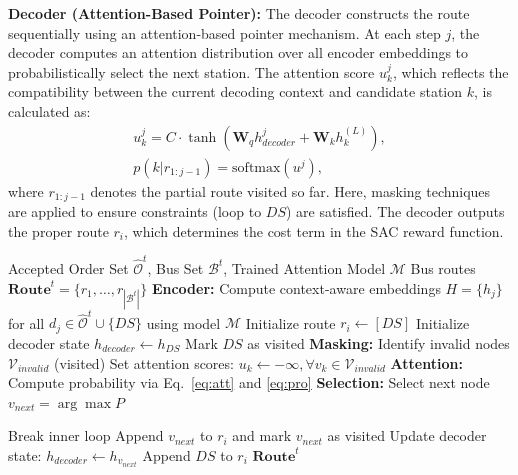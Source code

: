 \documentclass[lettersize,journal]{IEEEtran}
\begin{document}
\textbf{Decoder (Attention-Based Pointer):} 
The decoder constructs the route sequentially using an attention-based pointer mechanism. 
At each step $j$, the decoder computes an attention distribution over all encoder embeddings to probabilistically select the next station. The attention score $u_{k}^{j}$, which reflects the compatibility between the current decoding context and candidate station $k$, is calculated as:
\begin{gather}
    u_{k}^{j} = C \cdot \tanh(\mathbf{W}_{q} h_{decoder}^j + \mathbf{W}_{k} h_{k}^{(L)}), \label{eq:att} \\
    p(k | r_{1:j-1}) = \text{softmax}(u^j), \label{eq:pro}
\end{gather}
where $r_{1:j-1}$ denotes the partial route visited so far. Here, masking techniques are applied to ensure constraints (loop to $DS$) are satisfied. The decoder outputs the proper route $r_i$, which determines the cost term in the SAC reward function.

\color{blue}
\begin{algorithm}[tb]
\caption{Attention-Based Route Generation}
\label{alg:routing}
\begin{algorithmic}[1]
\REQUIRE Accepted Order Set $\hat{\mathcal{O}}^t$, Bus Set $\mathcal{B}^t$, Trained Attention Model $\mathcal{M}$
\ENSURE Bus routes $\mathbf{Route}^t = \{r_1, \dots, r_{|\mathcal{B}^t|}\}$
\STATE \textbf{Encoder:} Compute context-aware embeddings $H = \{h_j\}$ for all $d_j \in \hat{\mathcal{O}}^t \cup \{DS\}$ using model $\mathcal{M}$
    \STATE Initialize route $r_i \leftarrow [DS]$
    \STATE Initialize decoder state $h_{decoder} \leftarrow h_{DS}$ 
    \STATE Mark $DS$ as visited
        \STATE \textbf{Masking:} Identify invalid nodes $\mathcal{V}_{invalid}$ (visited)
        \STATE Set attention scores: $u_k \leftarrow -\infty, \forall v_k \in \mathcal{V}_{invalid}$
        \STATE \textbf{Attention:} Compute probability via Eq.~\eqref{eq:att} and \eqref{eq:pro}
        \STATE \textbf{Selection:} Select next node $v_{next} = \arg\max P$
        
            \STATE Break inner loop
        \ELSE
            \STATE Append $v_{next}$ to $r_i$ and mark $v_{next}$ as visited
            \STATE Update decoder state: $h_{decoder} \leftarrow h_{v_{next}}$
        \ENDIF
    \ENDWHILE
    \STATE Append $DS$ to $r_i$
\ENDFOR
\RETURN $\mathbf{Route}^t$
\end{algorithmic}
\end{algorithm}
\end{document}
